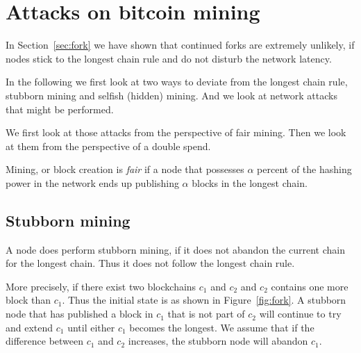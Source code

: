 
\section{Attacks on bitcoin mining}
\label{sec:attack}
In Section~\ref{sec:fork} we have shown that continued forks are
extremely unlikely, if nodes stick to the longest chain rule and
do not disturb the network latency.

In the following we first look at two ways to deviate from the 
longest chain rule, stubborn mining and selfish (hidden) mining.
And we look at network attacks that might be performed.

We first look at those attacks from the perspective of fair mining.
Then we look at them from the perspective of a double spend.

\begin{definition}
Mining, or block creation is \emph{fair} if a node that possesses $\alpha$ 
percent of the hashing power in the network ends up publishing $\alpha$
blocks in the longest chain.
\end{definition}


\subsection{Stubborn mining}
A node does perform stubborn mining, if it does not abandon the 
current chain for the longest chain. Thus it does not follow the longest chain rule.

More precisely, if there exist two blockchains $c_1$ and $c_2$ 
and $c_2$ contains one more block than $c_1$. Thus the initial state is as shown in Figure~\ref{fig:fork}.
A stubborn node that has published a block in $c_1$ that is not
part of $c_2$ will continue to try and extend $c_1$ until either
$c_1$ becomes the longest. We assume that if the difference between
$c_1$ and $c_2$ increases, the stubborn node will abandon $c_1$.

